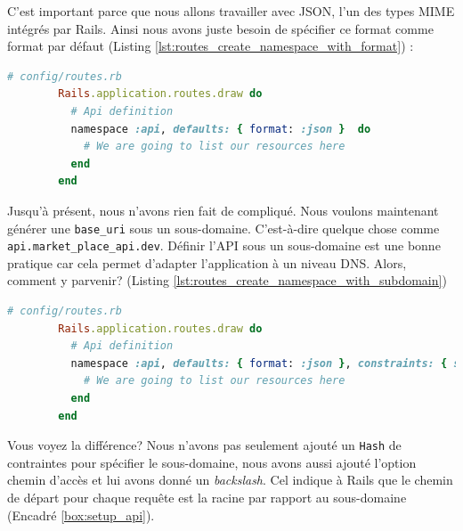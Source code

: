 \documentclass[]{report}
\begin{document}
      C'est important parce que nous allons travailler avec JSON, l'un des types MIME intégrés par Rails. Ainsi nous avons juste besoin de spécifier ce format comme format par défaut (Listing \ref{lst:routes_create_namespace_with_format}) :

      \begin{scriptsize}
        \begin{lstlisting}[language=ruby, caption={Création d'un Namespace avec un format par défault}, label={lst:routes_create_namespace_with_format}]
        # config/routes.rb
        Rails.application.routes.draw do
          # Api definition
          namespace :api, defaults: { format: :json }  do
            # We are going to list our resources here
          end
        end
        \end{lstlisting}
      \end{scriptsize}

      Jusqu'à présent, nous n'avons rien fait de compliqué. Nous voulons maintenant générer une \verb|base_uri| sous un sous-domaine. C'est-à-dire quelque chose comme \verb|api.market_place_api.dev|. Définir l'API sous un sous-domaine est une bonne pratique car cela permet d'adapter l'application à un niveau DNS. Alors, comment y parvenir? (Listing \ref{lst:routes_create_namespace_with_subdomain})

      \begin{scriptsize}
        \begin{lstlisting}[language=ruby, caption={Création d'un Namespace avec un format par défault}, label={lst:routes_create_namespace_with_subdomain}]
        # config/routes.rb
        Rails.application.routes.draw do
          # Api definition
          namespace :api, defaults: { format: :json }, constraints: { subdomain: 'api' }, path: '/'  do
            # We are going to list our resources here
          end
        end
        \end{lstlisting}
      \end{scriptsize}

      Vous voyez la différence? Nous n'avons pas seulement ajouté un \verb|Hash| de contraintes pour spécifier le sous-domaine, nous avons aussi ajouté l'option chemin d'accès et lui avons donné un \textit{backslash}. Cel indique à Rails que le chemin de départ pour chaque requête est la racine par rapport au sous-domaine (Encadré \ref{box:setup_api}).
\end{document}
